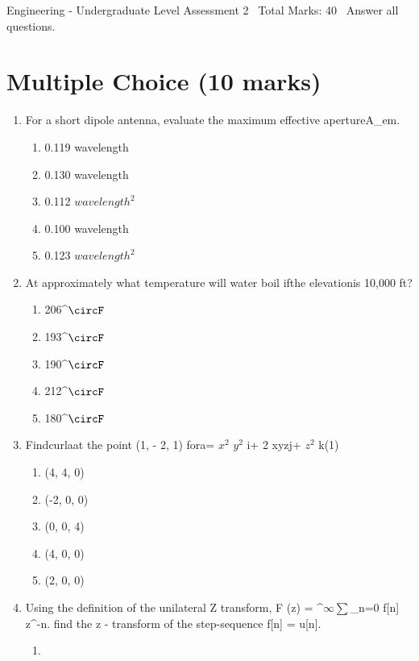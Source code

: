 \documentclass[12pt]{article}
\begin{document}
\begin{center}
Engineering - Undergraduate Level Assessment 2 \
Total Marks: 40 \
Answer all questions.
\end{center}

\section*{Multiple Choice (10 marks)}
\begin{enumerate}[label=\arabic*.]
\item For a short dipole antenna, evaluate the maximum effective apertureA\_em.
\begin{enumerate}[label=(\alph*)]
    \item 0.119 wavelength
    \item 0.130 wavelength
    \item 0.112 $wavelength^2$
    \item 0.100 wavelength
    \item 0.123 $wavelength^2$
\end{enumerate}
\item At approximately what temperature will water boil ifthe elevationis 10,000 ft?
\begin{enumerate}[label=(\alph*)]
    \item 206^\ensuremath{\circF}
    \item 193^\ensuremath{\circF}
    \item 190^\ensuremath{\circF}
    \item 212^\ensuremath{\circF}
    \item 180^\ensuremath{\circF}
\end{enumerate}
\item Findcurlaat the point (1, - 2, 1) fora= $x^2$ $y^2$ i+ 2 xyzj+ $z^2$ k(1)
\begin{enumerate}[label=(\alph*)]
    \item (4, 4, 0)
    \item (-2, 0, 0)
    \item (0, 0, 4)
    \item (4, 0, 0)
    \item (2, 0, 0)
\end{enumerate}
\item Using the definition of the unilateral Z transform, F (z) = ^\ensuremath{\infty}\ensuremath{\sum}\_n=0 f[n] z^-n. find the z - transform of the step-sequence f[n] = u[n].
\begin{enumerate}[label=(\alph*)]
    \item [1 / (z - 1)]

\end{enumerate}
\end{enumerate}
\end{document}
